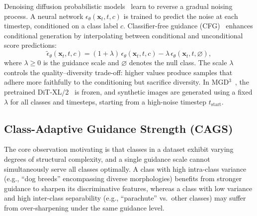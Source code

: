 Denoising diffusion probabilistic models~\cite{ho2020denoising} learn to reverse a gradual noising process. A neural network $\epsilon_\theta(\mathbf{x}_t, t, c)$ is trained to predict the noise at each timestep, conditioned on a class label $c$. Classifier-free guidance (CFG)~\cite{ho2022classifierfree} enhances conditional generation by interpolating between conditional and unconditional score predictions:
\begin{equation}
    \tilde{\epsilon}_\theta(\mathbf{x}_t, t, c) = (1 + \lambda)\,\epsilon_\theta(\mathbf{x}_t, t, c) - \lambda\,\epsilon_\theta(\mathbf{x}_t, t, \varnothing),
    \label{eq:cfg}
\end{equation}
where $\lambda \geq 0$ is the guidance scale and $\varnothing$ denotes the null class. The scale $\lambda$ controls the quality--diversity trade-off: higher values produce samples that adhere more faithfully to the conditioning but sacrifice diversity. In MGD$^3$~\cite{chansantiago2025modeguided}, the pretrained DiT-XL/2~\cite{peebles2022scalable} is frozen, and synthetic images are generated using a fixed $\lambda$ for all classes and timesteps, starting from a high-noise timestep $t_{\text{start}}$.

\subsection{Class-Adaptive Guidance Strength (CAGS)}
\label{sec:cags}

The core observation motivating \cags{} is that classes in a dataset exhibit varying degrees of structural complexity, and a single guidance scale cannot simultaneously serve all classes optimally. A class with high intra-class variance (e.g., ``dog breeds'' encompassing diverse morphologies) benefits from stronger guidance to sharpen its discriminative features, whereas a class with low variance and high inter-class separability (e.g., ``parachute'' vs.\ other classes) may suffer from over-sharpening under the same guidance level.


